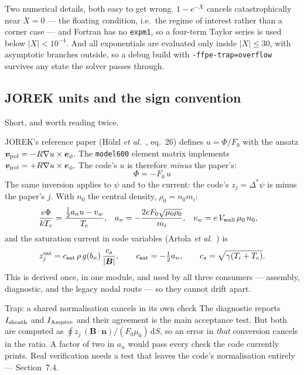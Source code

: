 \documentclass[11pt,a4paper]{article}
\newcommand{\zj}{z_j}
\newcommand{\zjsat}{z^{\mathrm{sat}}_{j}}
\newcommand{\dd}{\mathrm{d}}
\newcommand{\code}[1]{\texttt{\small #1}}
\begin{document}
Two numerical details, both easy to get wrong. $1-e^{-X}$ cancels catastrophically near $X=0$ --- the
floating condition, i.e.\ the regime of interest rather than a corner case --- and Fortran has no
\code{expm1}, so a four-term Taylor series is used below $|X|<10^{-4}$. And all exponentials are
evaluated only inside $|X|\le30$, with asymptotic branches outside, so a debug build with
\code{-ffpe-trap=overflow} survives any state the solver passes through.

\subsection{JOREK units and the sign convention}

Short, and worth reading twice.

JOREK's reference paper (H\"olzl \emph{et al.}~\cite{hoelzl2021}, eq.~26) defines $u=\Phi/F_0$ with the
ansatz $\bm{v}_{\rm pol}=-R\nabla u\times\bm{e}_\phi$. The \code{model600} element matrix implements
$\bm{v}_{\rm pol}=+R\nabla u\times\bm{e}_\phi$. The code's $u$ is therefore \emph{minus} the paper's:
\begin{equation}
  \boxed{\;\Phi = -F_0\,u\;}
\end{equation}
The same inversion applies to $\psi$ and to the current: the code's $\zj=\Delta^{*}\psi$ is minus the
paper's $j$. With $n_0$ the central density, $\rho_0=n_0m_i$:
\begin{align}
  \frac{e\Phi}{kT_e} &= \frac{\tfrac12 a_n u - v_w}{T_e}, &
  a_n &= -\frac{2 e F_0 \sqrt{\mu_0 \rho_0}}{m_i}, &
  v_w &= e\,V_{\rm wall}\,\mu_0\,n_0,
  \label{eq:an}
\end{align}
and the saturation current in code variables (Artola \emph{et al.}~\cite{artola}) is
\begin{equation}
  \zjsat = c_{\rm sat}\,\rho\,g(b_n)\,\frac{c_s}{|\bm{B}|},\qquad
  c_{\rm sat}=-\tfrac12 a_n,\qquad c_s = \sqrt{\gamma(T_i + T_e)}.
  \label{eq:zjsat}
\end{equation}
This is derived once, in one module, and used by all three consumers --- assembly, diagnostic, and
the legacy nodal route --- so they cannot drift apart.

\begin{warnbox}{Trap: a shared normalisation cancels in its own check}
The diagnostic reports $I_{\rm sheath}$ and $I_{\rm Amp\grave{e}re}$ and their agreement is the main
acceptance test. But both are computed as $\oint \zj\,(\bm{B}\!\cdot\!\bm{n})/(F_0\mu_0)\,\dd S$, so
an error in \emph{that} conversion cancels in the ratio. A factor of two in $a_n$ would pass every
check the code currently prints. Real verification needs a test that leaves the code's normalisation
entirely --- Section~7.4.
\end{warnbox}
\end{document}
